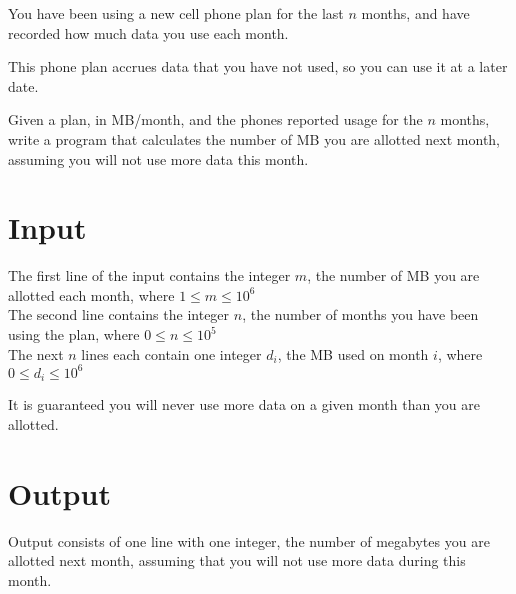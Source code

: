 
You have been using a new cell phone plan for the last $n$ months,
and have recorded how much data you use each month.

This phone plan accrues data that you have not used, so you can use it at a later date.

Given a plan, in MB/month, and the phones reported usage for the $n$ months,
write a program that calculates the number of MB you are allotted next month,
assuming you will not use more data this month.


\section*{Input}
The first line of the input contains the integer $m$, the number of MB you are allotted each month, where $1 \leq m \leq 10^6$ \\
The second line contains the integer $n$, the number of months you have been using the plan, where $0 \leq n \leq 10^5$ \\
The next $n$ lines each contain one integer $d_i$, the MB used on month $i$, where $0 \leq d_i \leq 10^6$

It is guaranteed you will never use more data on a given month than you are allotted.

\section*{Output}
Output consists of one line with one integer,
the number of megabytes you are allotted next month,
assuming that you will not use more data during this month.
